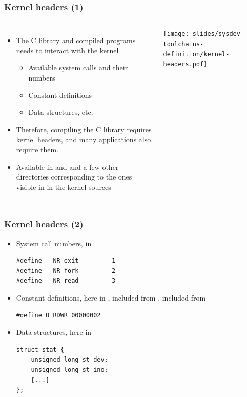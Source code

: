 \begin{frame}
  \frametitle{Kernel headers (1)}
  \begin{columns}
    \begin{itemize}
    \item The C library and compiled programs needs to interact with the kernel
      \begin{itemize}
      \item Available system calls and their numbers
      \item Constant definitions
      \item Data structures, etc.
      \end{itemize}
    \item Therefore, compiling the C library requires kernel headers, and many
      applications also require them.
    \item Available in  and  and a few
      other directories corresponding to the ones visible in
       in the kernel sources
    \end{itemize}
    \texttt{[image: slides/sysdev-toolchains-definition/kernel-headers.pdf]}
  \end{columns}
\end{frame}

\begin{frame}[fragile]
  \frametitle{Kernel headers (2)}
  \begin{itemize}
  \item System call numbers, in 
\begin{verbatim}
#define __NR_exit         1
#define __NR_fork         2
#define __NR_read         3
\end{verbatim}
  \item Constant definitions, here in ,
    included from , included from
\begin{verbatim}
#define O_RDWR 00000002
\end{verbatim}
\item Data structures, here in 
\begin{verbatim}
struct stat {
    unsigned long st_dev;
    unsigned long st_ino;
    [...]
};
\end{verbatim}
\end{itemize}
\end{frame}

